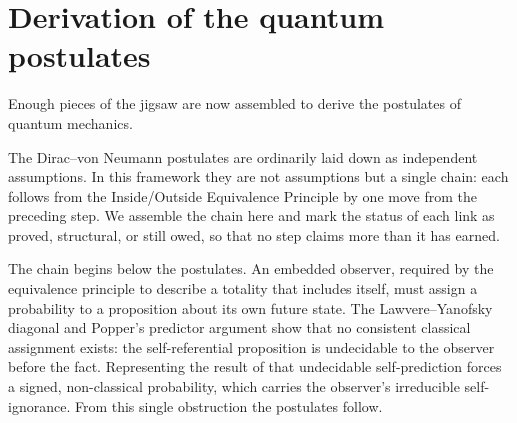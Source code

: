 \section{Derivation of the quantum postulates}
\label{sec:postulates}
Enough pieces of the jigsaw are now assembled to derive the postulates of quantum mechanics.

The Dirac--von Neumann postulates are ordinarily laid down as independent
assumptions. In this framework they are not assumptions but a single chain: each
follows from the Inside/Outside Equivalence Principle by one move from the
preceding step. We assemble the chain here and mark the status of each link as
proved, structural, or still owed, so that no step claims more than it has earned.

The chain begins below the postulates. An embedded observer, required by the
equivalence principle to describe a totality that includes itself, must assign a
probability to a proposition about its own future state. The Lawvere--Yanofsky
diagonal \autocite{Yanofsky2003} and Popper's predictor argument
\autocite{Popper1950a, Popper1950b} show that no consistent classical assignment
exists: the self-referential proposition is undecidable to the observer before
the fact. Representing the result of that undecidable self-prediction forces a
signed, non-classical probability, which carries the observer's irreducible
self-ignorance. From this single obstruction the postulates follow.

